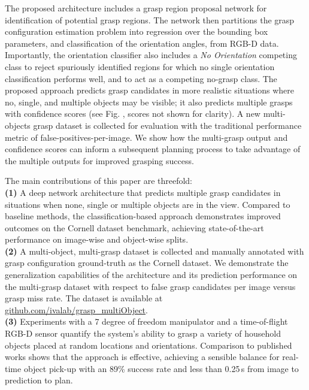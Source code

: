 \documentclass[letterpaper, 10 pt, journal, twoside]{IEEEtran}
\begin{document}
The proposed architecture includes a grasp region proposal network for
identification of potential grasp regions.
The network then partitions the grasp configuration estimation problem into
regression over the bounding box parameters, and classification of the
orientation angles, from RGB-D data. Importantly, the orientation classifier
also includes a {\em No Orientation} competing class to reject
spuriously identified regions for which no single orientation
classification performs well, and to act as a competing no-grasp class. 
The proposed approach predicts grasp candidates in more realistic
situations where no, single, and multiple objects may be visible; it
also predicts multiple grasps with confidence
scores (see Fig. , scores not shown for clarity). 
A new multi-objects grasp dataset is
collected for evaluation with the traditional performance metric of
false-positives-per-image.  We show how the multi-grasp output and
confidence scores can inform a subsequent planning process to take
advantage of the multiple outputs for improved grasping success.


  




The main contributions of this paper are threefold: \\
{\bf (1)} A deep network architecture that predicts multiple
grasp candidates in situations when none, single or multiple objects are
in the view. 
Compared to baseline methods, the classification-based
approach demonstrates improved outcomes on the Cornell dataset \cite{cornell2013}
benchmark, achieving state-of-the-art performance on image-wise and
object-wise splits. \\
{\bf (2)} A multi-object, multi-grasp dataset is collected and manually
annotated with grasp configuration ground-truth as the
Cornell dataset. We demonstrate the generalization capabilities of the
architecture and its prediction performance on the multi-grasp dataset
with respect to false grasp candidates per image versus grasp miss rate.  
The dataset is available at \url{github.com/ivalab/grasp_multiObject}. \\
{\bf (3)} Experiments with a 7 degree of freedom manipulator and a
time-of-flight RGB-D sensor quantify the system's ability to grasp a
variety of household objects placed at random locations and
orientations.  Comparison to published works shows that the approach is
effective, achieving a sensible balance for real-time object pick-up
with an 89\% success rate and less than 0.25\,s from image to prediction to
plan. 
\end{document}
